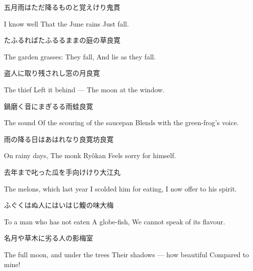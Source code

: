 \begin{haiku}
    {\FH 五月雨はただ降るものと覚えけり}\hfill{\FH 鬼貫}

    \vin{} I know well
    \vin{} \vin{} That the June rains
    \vin{} \vin{} \vin{} Just fall.
\end{haiku}

\begin{haiku}
    {\FH たふるればたふるるままの庭の草}\hfill{\FH 良寛}

    \vin{} The garden grasses:
    \vin{} \vin{} They fall,
    \vin{} \vin{} \vin{} And lie as they fall.
\end{haiku}

\begin{haiku}
    {\FH 盗人に取り残されし窓の月}\hfill{\FH 良寛}

    \vin{} The thief
    \vin{} \vin{} Left it behind ---
    \vin{} \vin{} \vin{} The moon at the window.
\end{haiku}

\begin{haiku}
    {\FH 鍋磨く音にまぎるる雨蛙}\hfill{\FH 良寛}

    \vin{} The sound
    \vin{} \vin{} Of the scouring of the saucepan
    \vin{} \vin{} \vin{} Blends with the green-frog's voice.
\end{haiku}

\begin{haiku}
    {\FH 雨の降る日はあはれなり良寛坊}\hfill{\FH 良寛}

    \vin{} On rainy days,
    \vin{} \vin{} The monk Ry\^okan
    \vin{} \vin{} \vin{} Feels sorry for himself.
\end{haiku}

\begin{haiku}
    {\FH 去年まで叱った瓜を手向けけり}\hfill{\FH 大江丸}

    \vin{} The melons, which last year
    \vin{} \vin{} I scolded him for eating,
    \vin{} \vin{} \vin{} I now offer to his spirit.
\end{haiku}

\begin{haiku}
    {\FH ふぐくはぬ人にはいはじ鰒の味}\hfill{\FH 大梅}

    \vin{} To a man who has not eaten
    \vin{} \vin{} A globe-fish,
    \vin{} \vin{} \vin{} We cannot speak of its flavour.
\end{haiku}

\begin{haiku}
    {\FH 名月や草木に劣る人の影}\hfill{\FH 梅室}

    \vin{} The full moon, and under the trees
    \vin{} \vin{} Their shadows --- how beautiful
    \vin{} \vin{} \vin{} Compared to mine!
\end{haiku}

